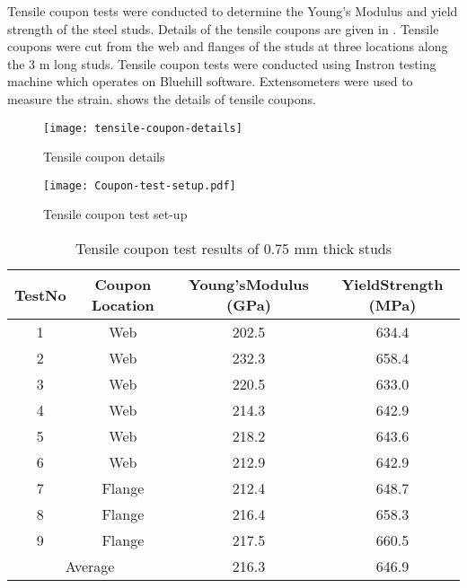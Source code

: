 Tensile coupon tests were conducted to determine the Young's Modulus and yield strength of the steel studs. Details of the tensile coupons are given in . Tensile coupons were cut from the web and flanges of the studs at three locations along the 3 m long studs. Tensile coupon tests were conducted using Instron testing machine which operates on Bluehill software. Extensometers were used to measure the strain.  shows the details of tensile coupons.  
\begin{figure}[!htbp]
	\centering
			\texttt{[image: tensile-coupon-details]}\\
		\caption{Tensile coupon details}
		\label{fig:tensile-coupon-details}
\end{figure}
\begin{figure}[!htbp]
	\centering
			\texttt{[image: Coupon-test-setup.pdf]}\\
		\caption{Tensile coupon test set-up}
		\label{fig:tensile-coupon-test-setup}
\end{figure}
\begin{table}
	\centering
	\caption{Tensile coupon test results of 0.75 mm thick studs}
	  \begin{tabular}{cccc}
	  \toprule
	  \multicolumn{1}{p{2.145em}}{\centering Test\newline{}No} & 
	  \multicolumn{1}{p{4.07em}}{\centering Coupon \newline{}Location} & 
	  \multicolumn{1}{p{7.07em}}{\centering Young's\newline{}Modulus (GPa)} & 
	  \multicolumn{1}{p{7.145em}}{\centering Yield\newline{}Strength (MPa)} \\
	  \midrule
	  1    & Web  &  202.5 & 634.4 \\
	  2    & Web  &  232.3 & 658.4 \\
	  3    & Web  &  220.5 & 633.0 \\
	  4    & Web  &  214.3 & 642.9 \\
	  5    & Web  &  218.2 & 643.6 \\
	  6    & Web  &  212.9 & 642.9 \\
	  7    & Flange &  212.4 & 648.7 \\
	  8    & Flange &  216.4 & 658.3 \\
	  9    & Flange &  217.5 & 660.5 \\
	  \midrule
	  \multicolumn{2}{c}{Average} & 216.3 & 646.9 \\
	  \bottomrule
	  \end{tabular}%
	\label{tab:075-coupon-results}%
  \end{table}%
